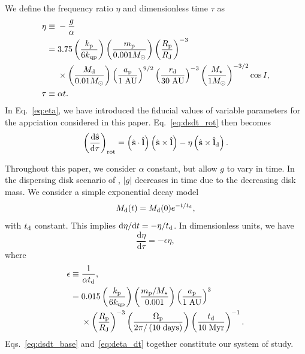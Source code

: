 \documentclass[
        fleqn,
        usenatbib,
    ]{mnras}
\newcommand*{\rd}[2]{\frac{\mathrm{d}#1}{\mathrm{d}#2}}
\newcommand*{\abs}[1]{\left|#1\right|}
\newcommand*{\bm}[1]{\boldsymbol{\mathbf{#1}}}
\newcommand*{\uv}[1]{\hat{\bm{#1}}}
\newcommand*{\p}[1]{\left(#1\right)}
\begin{document}
We define the frequency ratio $\eta$ and dimensionless time $\tau$ as
\begin{align}
    \eta \equiv{}& -\frac{g}{\alpha}\nonumber\\
        ={}& 3.75 \p{\frac{k_{\rm p}}{6k_{\rm qp}}}
            \p{\frac{m_{\rm p}}{0.001 M_\odot}}
            \p{\frac{R_{\rm p}}{R_{\rm J}}}^{-3}\nonumber\\
        &\times \p{\frac{M_{\rm d}}{0.01 M_{\odot}}}
            \p{\frac{a_{\rm p}}{1\;\mathrm{AU}}}^{9/2}
            \p{\frac{r_{\rm d}}{30 \;\mathrm{AU}}}^{-3}
            \p{\frac{M_\star}{1M_{\odot}}}^{-3/2}
            \cos I,\label{eq:eta}\\
    \tau \equiv{}& \alpha t.
\end{align}
In Eq.~\eqref{eq:eta}, we have introduced the fiducial values of variable
parameters for the appciation considered in this paper. Eq.~\eqref{eq:dsdt_rot}
then becomes
\begin{equation}
    \p{\rd{\uv{s}}{\tau}}_{\rm rot} = \p{\uv{s} \cdot \uv{l}}
            \p{\uv{s} \times \uv{l}}
        - \eta\p{\uv{s} \times \uv{l}_{\rm d}}. \label{eq:dsdt_base}
\end{equation}

Throughout this paper, we consider $\alpha$ constant, but allow $g$ to vary in
time. In the dispersing disk scenario of \citet{millholland_disk}, $\abs{g}$
decreases in time due to the decreasing disk mass. We consider a simple
exponential decay model
\begin{equation}
    M_{\rm d}(t) = M_{\rm d}(0)e^{-t/t_{\rm d}},\label{eq:dmd_dt}
\end{equation}
with $t_{\rm d}$ constant. This implies $\mathrm{d}\eta / \mathrm{d}t = -\eta /
t_{\rm d}$. In dimensionless units, we have
\begin{equation}
    \rd{\eta}{\tau} = -\epsilon \eta\label{eq:deta_dt},
\end{equation}
where
\begin{align}
    \epsilon \equiv{}& \frac{1}{\alpha t_{\rm d}},\label{eq:eps_def}\\
        ={}& 0.015 \p{\frac{k_{\rm p}}{6k_{\rm qp}}}
            \p{\frac{m_{\rm p}/M_\star}{0.001}}
            \p{\frac{a_{\rm p}}{1\;\mathrm{AU}}}^3\nonumber\\
        &\times \p{\frac{R_{\rm p}}{R_{\rm J}}}^{-3}
            \p{\frac{\Omega_{\rm p}}{2\pi/\p{10\;\mathrm{days}}}}
            \p{\frac{t_{\rm d}}{10\;\mathrm{Myr}}}^{-1}.
\end{align}
Eqs.~\eqref{eq:dsdt_base} and~\eqref{eq:deta_dt} together constitute our system
of study.
\end{document}

